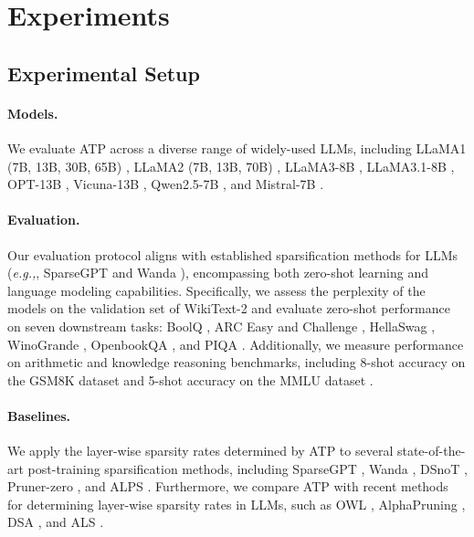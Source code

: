 \section{Experiments}\label{sec:experiments}
\subsection{Experimental Setup}

\paragraph{Models.} We evaluate ATP across a diverse range of widely-used LLMs, including LLaMA1 (7B, 13B, 30B, 65B) \citep{touvron2023llama}, LLaMA2 (7B, 13B, 70B) \citep{touvron2023llama2}, LLaMA3-8B \citep{llama3}, LLaMA3.1-8B \citep{llama31}, OPT-13B \citep{zhang2022opt}, Vicuna-13B \citep{chiang2023vicuna}, Qwen2.5-7B \citep{yang2024qwen2}, and Mistral-7B \citep{jiang2023mistral}.  
\paragraph{Evaluation.} Our evaluation protocol aligns with established sparsification methods for LLMs (\emph{e.g.,}, SparseGPT \citep{frantar2023sparsegpt} and Wanda \citep{sun2023simple}), encompassing both zero-shot learning and language modeling capabilities. Specifically, we assess the perplexity of the models on the validation set of WikiText-2 \citep{merity2016pointer} and evaluate zero-shot performance on seven downstream tasks: BoolQ \citep{clark2019boolq}, ARC Easy and Challenge \citep{clark2018think}, HellaSwag \citep{zellers2019hellaswag}, WinoGrande \citep{sakaguchi2021winogrande}, OpenbookQA \citep{mihaylov2018can}, and PIQA \citep{bisk2020piqa}. Additionally, we measure performance on arithmetic and knowledge reasoning benchmarks, including 8-shot accuracy on the GSM8K dataset \citep{cobbe2021training} and 5-shot accuracy on the MMLU dataset \citep{hendrycks2020measuring}.  
\paragraph{Baselines.} We apply the layer-wise sparsity rates determined by ATP to several state-of-the-art post-training sparsification methods, including SparseGPT \citep{frantar2023sparsegpt}, Wanda \citep{sun2023simple}, DSnoT \citep{zhang2023dynamic}, Pruner-zero \citep{dong2024pruner}, and ALPS \citep{meng2024alps}. Furthermore, we compare ATP with recent methods for determining layer-wise sparsity rates in LLMs, such as OWL \citep{yin2023outlier}, AlphaPruning \citep{lu2024alphapruning}, DSA \citep{li2024discovering}, and ALS \citep{li2024adaptive}.  
